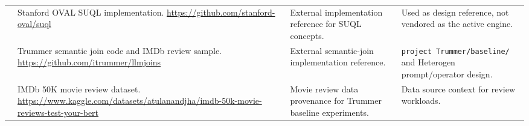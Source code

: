 \documentclass[11pt,oneside]{book}
\begin{document}
\begin{center}
\begin{longtable}{@{}>{\RaggedRight\arraybackslash}p{}>{\RaggedRight\arraybackslash}p{}>{\RaggedRight\arraybackslash}p{}>{\RaggedRight\arraybackslash}p{}@{}}
 & Stanford OVAL SUQL implementation. \url{https://github.com/stanford-oval/suql} & External implementation reference for SUQL concepts. & Used as design reference, not vendored as the active engine. \\
 & Trummer semantic join code and IMDb review sample. \url{https://github.com/itrummer/llmjoins} & External semantic-join implementation reference. & \texttt{project Trummer/baseline/} and Heterogen prompt/operator design. \\
\relax [IMDb50K] & IMDb 50K movie review dataset. \url{https://www.kaggle.com/datasets/atulanandjha/imdb-50k-movie-reviews-test-your-bert} & Movie review data provenance for Trummer baseline experiments. & Data source context for review workloads. \\
\bottomrule
\end{longtable}
\end{center}
\end{document}
